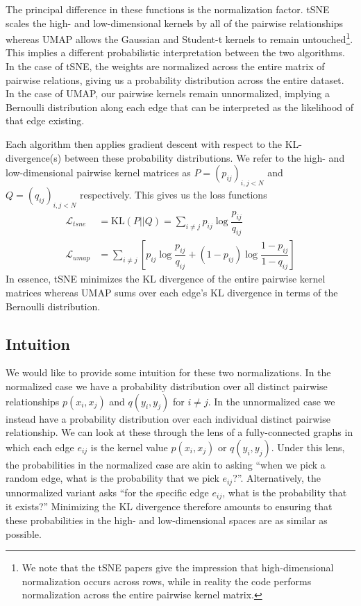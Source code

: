 \documentclass[sigconf, nonacm]{acmart}
\begin{document}
The principal difference in these functions is the normalization factor. tSNE scales the high- and low-dimensional kernels by all of the pairwise
relationships whereas UMAP allows the Gaussian and Student-t kernels to remain untouched\footnote{We note that the tSNE papers give the impression that
high-dimensional normalization 
occurs across rows, while in reality the code performs normalization across the entire pairwise kernel matrix.}. This implies a different probabilistic
interpretation between the two algorithms. In the case of tSNE, the weights are normalized across the entire matrix of pairwise relations, giving us 
a probability distribution across the entire dataset. In the case of UMAP, our pairwise kernels remain unnormalized, implying a Bernoulli distribution along
each edge that can be interpreted as the likelihood of that edge existing.

Each algorithm then applies gradient descent with respect to the KL-divergence(s) between these probability distributions. We refer to the high- and
low-dimensional pairwise kernel matrices as $P = \left( p_{ij} \right)_{i, j < N}$ and $Q = \left( q_{ij}
\right)_{i, j < N}$ respectively. This gives us the loss functions
\begin{align}
    \mathcal{L}_{tsne} &= \text{KL} (P || Q) = \sum_{i \neq j} p_{ij} \log \dfrac{p_{ij}}{q_{ij}} \\
    \mathcal{L}_{umap} &= \sum_{i \neq j} \left[ p_{ij} \log \dfrac{p_{ij}}{q_{ij}} + (1 - p_{ij}) \log \dfrac{1 - p_{ij}}{1 - q_{ij}} \right]
\end{align}
In essence, tSNE minimizes the KL divergence of the entire pairwise kernel matrices whereas UMAP sums over each edge's KL divergence in terms of the Bernoulli distribution.

\subsection{Intuition}

We would like to provide some intuition for these two normalizations. In the normalized case we have a probability distribution over all
distinct pairwise relationships $p(x_i, x_j)$ and $q(y_i, y_j)$ for $i \neq j$. In the unnormalized case we instead have a probability distribution over each
individual distinct pairwise relationship. We can look at these through the lens of a fully-connected graphs in which each edge $e_{ij}$ is the
kernel value $p(x_i, x_j)$ or $q(y_i, y_j)$. Under this lens, the probabilities in the normalized case are akin to asking ``when we pick a random edge, what is the
probability that we pick $e_{ij}$?''. Alternatively, the unnormalized variant asks ``for the specific edge $e_{ij}$, what is the probability that it exists?''
Minimizing the KL divergence therefore amounts to ensuring that these probabilities in the high- and low-dimensional spaces are as similar as possible.
\end{document}
